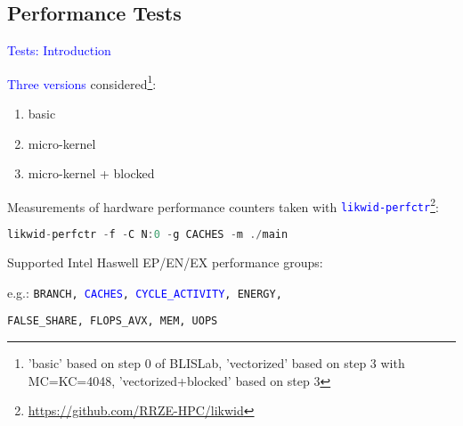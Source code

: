 \documentclass[11pt]{beamer}
\begin{document}
\subsection{Performance Tests}

\begin{frame}[fragile]{\textcolor{blue}{Tests: Introduction}}

\textcolor{blue}{Three versions} considered\footnote{'basic' based on step 0 of BLISLab, 'vectorized' based on step 3 with MC=KC=4048, 'vectorized+blocked' based on step 3}:
\begin{enumerate}
\item basic
\item micro-kernel
\item micro-kernel + blocked
\end{enumerate}

\vspace{0.5cm}

Measurements of hardware performance counters taken with \textcolor{blue}{\texttt{likwid-perfctr}}\footnote{
\url{https://github.com/RRZE-HPC/likwid}
}:


\begin{footnotesize}
\begin{lstlisting}[language=C++]
	likwid-perfctr -f -C N:0 -g CACHES -m ./main
\end{lstlisting}
\end{footnotesize}

Supported Intel Haswell EP/EN/EX performance groups: 

\qquad e.g.: \texttt{BRANCH, \textcolor{blue}{CACHES}, \textcolor{blue}{CYCLE\_ACTIVITY}, ENERGY,} 

\qquad\qquad\texttt{FALSE\_SHARE, FLOPS\_AVX, MEM, UOPS }

\end{frame}
\end{document}
